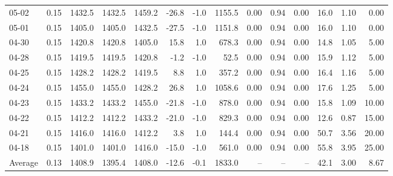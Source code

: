 \begin{threeparttable}
{\begin{tabular}{lrrrrrrrrrrrrr}
  05-02 &     0.15 & 1432.5 & 1432.5 & 1459.2 &      -26.8 &                     -1.0 &              1155.5 &       0.00 &      0.94 &           0.00 &             16.0 &            1.10 &                   0.00 \\
  05-01 &     0.15 & 1405.0 & 1405.0 & 1432.5 &      -27.5 &                     -1.0 &              1151.8 &       0.00 &      0.94 &           0.00 &             16.0 &            1.10 &                   0.00 \\
  04-30 &     0.15 & 1420.8 & 1420.8 & 1405.0 &       15.8 &                      1.0 &               678.3 &       0.00 &      0.94 &           0.00 &             14.8 &            1.05 &                   5.00 \\
  04-28 &     0.15 & 1419.5 & 1419.5 & 1420.8 &       -1.2 &                     -1.0 &                52.5 &       0.00 &      0.94 &           0.00 &             15.9 &            1.12 &                   5.00 \\
  04-25 &     0.15 & 1428.2 & 1428.2 & 1419.5 &        8.8 &                      1.0 &               357.2 &       0.00 &      0.94 &           0.00 &             16.4 &            1.16 &                   5.00 \\
  04-24 &     0.15 & 1455.0 & 1455.0 & 1428.2 &       26.8 &                      1.0 &              1058.6 &       0.00 &      0.94 &           0.00 &             17.6 &            1.25 &                   5.00 \\
  04-23 &     0.15 & 1433.2 & 1433.2 & 1455.0 &      -21.8 &                     -1.0 &               878.0 &       0.00 &      0.94 &           0.00 &             15.8 &            1.09 &                  10.00 \\
  04-22 &     0.15 & 1412.2 & 1412.2 & 1433.2 &      -21.0 &                     -1.0 &               829.3 &       0.00 &      0.94 &           0.00 &             12.6 &            0.87 &                  15.00 \\
  04-21 &     0.15 & 1416.0 & 1416.0 & 1412.2 &        3.8 &                      1.0 &               144.4 &       0.00 &      0.94 &           0.00 &             50.7 &            3.56 &                  20.00 \\
  04-18 &     0.15 & 1401.0 & 1401.0 & 1416.0 &      -15.0 &                     -1.0 &               561.0 &       0.00 &      0.94 &           0.00 &             55.8 &            3.95 &                  25.00 \\
Average &     0.13 & 1408.9 & 1395.4 & 1408.0 &      -12.6 &                     -0.1 &              1833.0 &         -- &        -- &             -- &             42.1 &            3.00 &                   8.67 \\

\end{tabular}}
\end{threeparttable}
